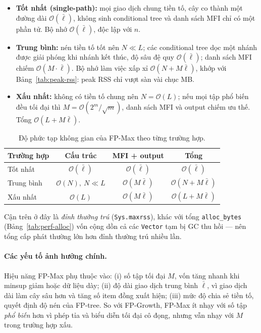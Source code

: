\begin{itemize}
  \item \textbf{Tốt nhất (single-path):} mọi giao dịch chung tiền tố, cây co thành một đường dài $\mathcal{O}(\bar{\ell})$, không sinh conditional tree và danh sách MFI chỉ có một phần tử. Bộ nhớ $\mathcal{O}(\bar{\ell})$, độc lập với $n$.
  \item \textbf{Trung bình:} nén tiền tố tốt nên $N \ll L$; các conditional tree dọc một nhánh được giải phóng khi nhánh kết thúc, độ sâu đệ quy $\mathcal{O}(\bar{\ell})$; danh sách MFI chiếm $\mathcal{O}(M\cdot\bar{\ell})$. Bộ nhớ làm việc xấp xỉ $\mathcal{O}(N + M\bar{\ell})$, khớp với Bảng~\ref{tab:peak-rss}: peak RSS chỉ vượt sàn vài chục MB.
  \item \textbf{Xấu nhất:} không có tiền tố chung nên $N = \mathcal{O}(L)$; nếu mọi tập phổ biến đều tối đại thì $M = \mathcal{O}(2^m/\sqrt{m})$, danh sách MFI và output chiếm ưu thế. Tổng $\mathcal{O}(L + M\bar{\ell})$.
\end{itemize}

\begin{table}[H]
  \centering
  \caption{Độ phức tạp không gian của FP-Max theo từng trường hợp.}
  \label{tab:space-complexity}
  \begin{tabular}{lccc}
    \toprule
    Trường hợp & Cấu trúc & MFI + output & Tổng \\
    \midrule
    Tốt nhất    & $\mathcal{O}(\bar{\ell})$       & $\mathcal{O}(\bar{\ell})$    & $\mathcal{O}(\bar{\ell})$ \\
    Trung bình  & $\mathcal{O}(N),\ N \ll L$      & $\mathcal{O}(M\bar{\ell})$   & $\mathcal{O}(N + M\bar{\ell})$ \\
    Xấu nhất    & $\mathcal{O}(L)$                & $\mathcal{O}(M\bar{\ell})$   & $\mathcal{O}(L + M\bar{\ell})$ \\
    \bottomrule
  \end{tabular}
\end{table}

Cận trên ở đây là \emph{đỉnh thường trú} (\texttt{Sys.maxrss}), khác với tổng \texttt{alloc\_bytes} (Bảng~\ref{tab:perf-alloc}) vốn cộng dồn cả các \texttt{Vector} tạm bị GC thu hồi --- nên tổng cấp phát thường lớn hơn đỉnh thường trú nhiều lần.

\paragraph{Các yếu tố ảnh hưởng chính.}
Hiệu năng FP-Max phụ thuộc vào: (i) số tập tối đại $M$, vốn tăng nhanh khi minsup giảm hoặc dữ liệu dày; (ii) độ dài giao dịch trung bình $\bar{\ell}$, vì giao dịch dài làm cây sâu hơn và tăng số item đồng xuất hiện; (iii) mức độ chia sẻ tiền tố, quyết định độ nén của FP-tree. So với FP-Growth, FP-Max ít nhạy với số tập \emph{phổ biến} hơn vì phép tỉa và biểu diễn tối đại cô đọng, nhưng vẫn nhạy với $M$ trong trường hợp xấu.

